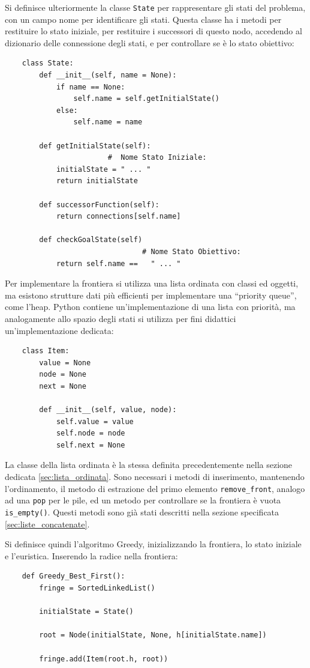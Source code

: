 \documentclass{article}
\numberwithin{equation}{subsection}
\begin{document}
Si definisce ulteriormente la classe \verb|State| per rappresentare gli stati del problema, con 
un campo nome per identificare gli stati. Questa classe ha i metodi per restituire lo 
stato iniziale, per restituire i successori di questo nodo, accedendo al dizionario delle 
connessione degli stati, e per controllare se è lo stato obiettivo:
\begin{verbatim}
    class State:
        def __init__(self, name = None):
            if name == None:
                self.name = self.getInitialState()
            else:
                self.name = name

        def getInitialState(self):
                        #  Nome Stato Iniziale:
            initialState = " ... " 
            return initialState

        def successorFunction(self):
            return connections[self.name]

        def checkGoalState(self)
                                # Nome Stato Obiettivo:
            return self.name ==   " ... "
\end{verbatim}

Per implementare la frontiera si utilizza una lista ordinata con classi ed oggetti, ma esistono 
strutture dati più efficienti per implementare una ``priority queue'', come l'heap. Python 
contiene un'implementazione di una lista con priorità, ma analogamente allo spazio degli stati 
si utilizza per fini didattici un'implementazione dedicata:
\begin{verbatim}
    class Item:
        value = None
        node = None
        next = None

        def __init__(self, value, node):
            self.value = value
            self.node = node
            self.next = None
\end{verbatim}

La classe della lista ordinata è la stessa definita precedentemente nella sezione 
dedicata \ref{sec:lista_ordinata}. 
Sono necessari i metodi di inserimento, mantenendo l'ordinamento, il metodo di 
estrazione del primo elemento \verb|remove_front|, analogo ad una \verb|pop| per le pile, 
ed un metodo per controllare se la frontiera è vuota \verb|is_empty()|. Questi metodi sono già stati descritti nella sezione specificata 
\ref{sec:liste_concatenate}. 


Si definisce quindi l'algoritmo Greedy, inizializzando la frontiera, lo stato iniziale e 
l'euristica. Inserendo la radice nella frontiera:
\begin{verbatim}
    def Greedy_Best_First():
        fringe = SortedLinkedList() 

        initialState = State()
        
        root = Node(initialState, None, h[initialState.name])

        fringe.add(Item(root.h, root))
\end{verbatim}
\end{document}

